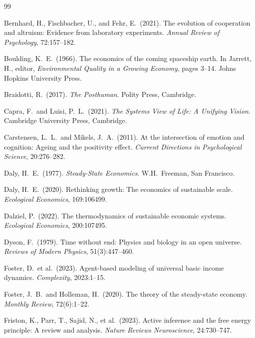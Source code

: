 \documentclass[12pt,a4paper]{article}
\theoremstyle{definition}
\begin{document}

\begin{thebibliography}{99}

Bernhard, H., Fischbacher, U., and Fehr, E.\ (2021).
The evolution of cooperation and altruism: Evidence from laboratory
experiments.
\textit{Annual Review of Psychology}, 72:157--182.

Boulding, K.\ E.\ (1966).
The economics of the coming spaceship earth.
In Jarrett, H., editor, \textit{Environmental Quality in a Growing Economy},
pages 3--14. Johns Hopkins University Press.

Braidotti, R.\ (2017).
\textit{The Posthuman}.
Polity Press, Cambridge.

Capra, F.\ and Luisi, P.\ L.\ (2021).
\textit{The Systems View of Life: A Unifying Vision}.
Cambridge University Press, Cambridge.

Carstensen, L.\ L.\ and Mikels, J.\ A.\ (2011).
At the intersection of emotion and cognition: Ageing and the positivity effect.
\textit{Current Directions in Psychological Science}, 20:276--282.

Daly, H.\ E.\ (1977).
\textit{Steady-State Economics}.
W.H.\ Freeman, San Francisco.

Daly, H.\ E.\ (2020).
Rethinking growth: The economics of sustainable scale.
\textit{Ecological Economics}, 169:106499.

Dalziel, P.\ (2022).
The thermodynamics of sustainable economic systems.
\textit{Ecological Economics}, 200:107495.

Dyson, F.\ (1979).
Time without end: Physics and biology in an open universe.
\textit{Reviews of Modern Physics}, 51(3):447--460.

Foster, D.\ et al.\ (2023).
Agent-based modeling of universal basic income dynamics.
\textit{Complexity}, 2023:1--15.

Foster, J.\ B.\ and Holleman, H.\ (2020).
The theory of the steady-state economy.
\textit{Monthly Review}, 72(6):1--22.

Friston, K., Parr, T., Sajid, N., et al.\ (2023).
Active inference and the free energy principle: A review and analysis.
\textit{Nature Reviews Neuroscience}, 24:730--747.


\end{thebibliography}
\end{document}
